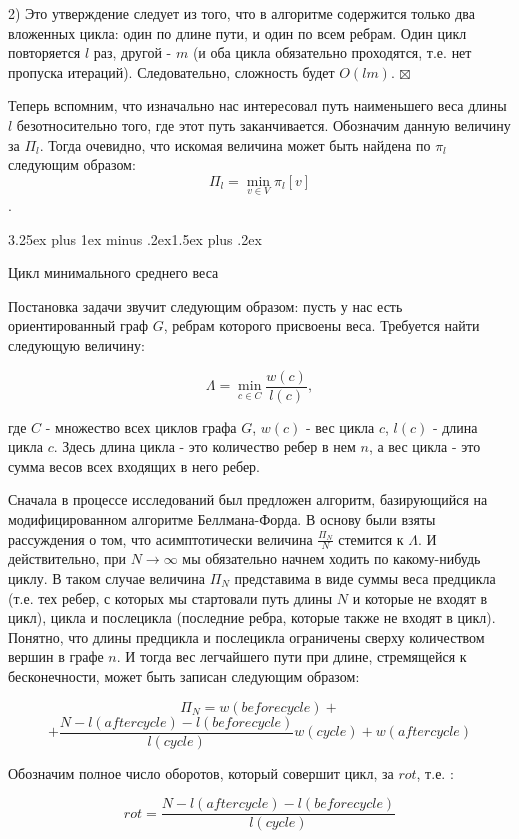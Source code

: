 \documentclass[a4paper,12pt]{report}
\makeatletter
\theoremstyle{plain} %
\theoremstyle{definition}
\theoremstyle{remark}
\renewcommand{\subsection}{\@startsection{subsection}{2}{18pt}%
{3.25ex plus 1ex minus .2ex}{1.5ex plus .2ex}%
{\normalfont\large\bfseries\raggedright}}%
\makeatother
\begin{document}
\begin{large}
2) Это утверждение следует из того, что в алгоритме содержится только два вложенных цикла: один по длине пути, и один по всем ребрам. Один цикл повторяется $l$ раз, другой - $m$ (и оба цикла обязательно проходятся, т.е. нет пропуска итераций). Следовательно, сложность будет $O(lm)$.
$\boxtimes$

\bigskip

Теперь вспомним, что изначально нас интересовал путь наименьшего веса длины $l$ безотносительно того, где этот путь заканчивается. Обозначим данную величину за $\Pi_l$. Тогда очевидно, что искомая величина может быть найдена по $\pi_l$ следующим образом: $$\Pi_l = \min_{v \in V} \pi_l[v]$$.

\subsection{Цикл минимального среднего веса}

Постановка задачи звучит следующим образом: пусть у нас есть ориентированный граф $G$, ребрам которого присвоены веса. Требуется найти следующую величину:

$$\Lambda = \min _{c \in C} \frac{w(c)}{l(c)},$$

где $C$ - множество всех циклов графа $G$, $w(c)$ - вес цикла $c$, $l(c)$ - длина цикла $c$. Здесь длина цикла - это количество ребер в нем $n$, а вес цикла - это сумма весов всех входящих в него ребер.

Сначала в процессе исследований был предложен алгоритм, базирующийся на модифицированном алгоритме Беллмана-Форда. В основу были взяты рассуждения о том, что асимптотически величина $\frac{\Pi_N}{N}$ стемится к $\Lambda$.  И действительно, при $N \rightarrow \infty$ мы обязательно начнем ходить по какому-нибудь циклу. В таком случае величина $\Pi_N$ представима в виде суммы веса предцикла (т.е. тех ребер, с которых мы стартовали путь длины $N$ и которые не входят в цикл), цикла и послецикла (последние ребра, которые также не входят в цикл). Понятно, что длины предцикла и послецикла ограничены сверху количеством вершин в графе $n$. И тогда вес легчайшего пути при длине, стремящейся к бесконечности, может быть записан следующим образом:

$$\Pi_N = w(beforecycle) + $$
$$+\frac{N - l(aftercycle) - l(beforecycle)}{l(cycle)}w(cycle) + w(aftercycle)$$

Обозначим полное число оборотов, который совершит цикл, за $rot$, т.е. :

$$rot =  \frac{N - l(aftercycle) - l(beforecycle)}{l(cycle)}$$


\end{large}
\end{document}
